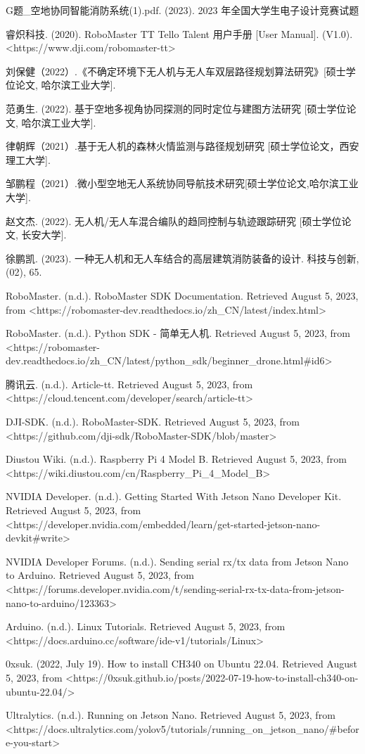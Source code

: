 \documentclass[12pt, a4paper, oneside]{article}
\begin{document}
G题_空地协同智能消防系统(1).pdf. (2023). 2023 年全国大学生电子设计竞赛试题

睿炽科技. (2020). RoboMaster TT Tello Talent 用户手册 [User Manual]. (V1.0). <https://www.dji.com/robomaster-tt>

刘保健（2022）.《不确定环境下无人机与无人车双层路径规划算法研究》[硕士学位论文, 哈尔滨工业大学].

范勇生. (2022). 基于空地多视角协同探测的同时定位与建图方法研究 [硕士学位论文, 哈尔滨工业大学].

律朝辉（2021）.基于无人机的森林火情监测与路径规划研究 [硕士学位论文，西安理工大学].

邹鹏程（2021）.微小型空地无人系统协同导航技术研究[硕士学位论文,哈尔滨工业大学].

赵文杰. (2022). 无人机/无人车混合编队的趋同控制与轨迹跟踪研究 [硕士学位论文, 长安大学].

徐鹏凯. (2023). 一种无人机和无人车结合的高层建筑消防装备的设计. 科技与创新, (02), 65.

RoboMaster. (n.d.). RoboMaster SDK Documentation. Retrieved August 5, 2023, from <https://robomaster-dev.readthedocs.io/zh_CN/latest/index.html>

RoboMaster. (n.d.). Python SDK - 简单无人机. Retrieved August 5, 2023, from <https://robomaster-dev.readthedocs.io/zh_CN/latest/python_sdk/beginner_drone.html#id6>

腾讯云. (n.d.). Article-tt. Retrieved August 5, 2023, from <https://cloud.tencent.com/developer/search/article-tt>

DJI-SDK. (n.d.). RoboMaster-SDK. Retrieved August 5, 2023, from <https://github.com/dji-sdk/RoboMaster-SDK/blob/master>

Diustou Wiki. (n.d.). Raspberry Pi 4 Model B. Retrieved August 5, 2023, from <https://wiki.diustou.com/cn/Raspberry_Pi_4_Model_B>

NVIDIA Developer. (n.d.). Getting Started With Jetson Nano Developer Kit. Retrieved August 5, 2023, from <https://developer.nvidia.com/embedded/learn/get-started-jetson-nano-devkit#write>

NVIDIA Developer Forums. (n.d.). Sending serial rx/tx data from Jetson Nano to Arduino. Retrieved August 5, 2023, from <https://forums.developer.nvidia.com/t/sending-serial-rx-tx-data-from-jetson-nano-to-arduino/123363>

Arduino. (n.d.). Linux Tutorials. Retrieved August 5, 2023, from <https://docs.arduino.cc/software/ide-v1/tutorials/Linux>

0xsuk. (2022, July 19). How to install CH340 on Ubuntu 22.04. Retrieved August 5, 2023, from <https://0xsuk.github.io/posts/2022-07-19-how-to-install-ch340-on-ubuntu-22.04/>

Ultralytics. (n.d.). Running on Jetson Nano. Retrieved August 5, 2023, from <https://docs.ultralytics.com/yolov5/tutorials/running_on_jetson_nano/#before-you-start>
\end{document}
